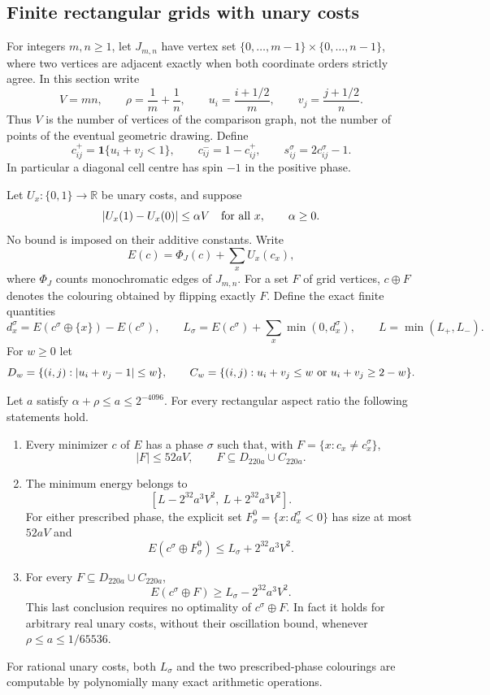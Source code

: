 \subsection{Finite rectangular grids with unary costs}

For integers $m,n\ge1$, let $J_{m,n}$ have vertex set
$\{0,\ldots,m-1\}\times\{0,\ldots,n-1\}$, where two vertices are adjacent
exactly when both coordinate orders strictly agree.  In this section write
\[
 V=mn,\qquad \rho=\frac1m+\frac1n,\qquad
 u_i=\frac{i+1/2}{m},\qquad v_j=\frac{j+1/2}{n}.
\]
Thus $V$ is the number of vertices of the comparison graph, not the
number of points of the eventual geometric drawing.  Define
\[
 c^+_{ij}=\mathbf1\{u_i+v_j<1\},\qquad c^-_{ij}=1-c^+_{ij},
 \qquad s^\sigma_{ij}=2c^\sigma_{ij}-1.
\]
In particular a diagonal cell centre has spin $-1$ in the positive phase.

Let $U_x:\{0,1\}\to\mathbb R$ be unary costs, and suppose
\[
 |U_x(1)-U_x(0)|\le\alpha V\quad\hbox{for all }x,
 \qquad \alpha\ge0.
\]
No bound is imposed on their additive constants.  Write
\[
 E(c)=\Phi_J(c)+\sum_xU_x(c_x),
\]
where $\Phi_J$ counts monochromatic edges of $J_{m,n}$.
For a set $F$ of grid vertices, $c\oplus F$ denotes the colouring obtained
by flipping exactly $F$.  Define the exact finite quantities
\begin{equation}
 d_x^\sigma=E(c^\sigma\oplus\{x\})-E(c^\sigma),\qquad
 L_\sigma=E(c^\sigma)+\sum_x\min(0,d_x^\sigma),\qquad
 L=\min(L_+,L_-).
 \label{eq:finite-linear-floor}
\end{equation}
For $w\ge0$ let
\[
 D_w=\{(i,j):|u_i+v_j-1|\le w\},\qquad
 C_w=\{(i,j):u_i+v_j\le w\ \hbox{or}\ u_i+v_j\ge2-w\}.
\]

\begin{theorem}
\label{thm:grid}
Let $a$ satisfy $\alpha+\rho\le a\le2^{-4096}$.
For every rectangular aspect ratio the following statements hold.
\begin{enumerate}
 \item Every minimizer $c$ of $E$ has a phase $\sigma$ such that, with
 $F=\{x:c_x\ne c_x^\sigma\}$,
 \[
 |F|\le52aV,\qquad F\subseteq D_{220a}\cup C_{220a}.
 \]
 \item The minimum energy belongs to
 \[
 [L-2^{32}a^3V^2,\ L+2^{32}a^3V^2].
 \]
 For either prescribed phase, the explicit set
 $F_\sigma^0=\{x:d_x^\sigma<0\}$ has size at most $52aV$ and
 \[
 E(c^\sigma\oplus F_\sigma^0)\le L_\sigma+2^{32}a^3V^2.
 \]
 \item For every $F\subseteq D_{220a}\cup C_{220a}$,
 \[
 E(c^\sigma\oplus F)\ge L_\sigma-2^{32}a^3V^2.
 \]
 This last conclusion requires no optimality of $c^\sigma\oplus F$.
 In fact it holds for arbitrary real unary costs, without their oscillation
 bound, whenever $\rho\le a\le1/65536$.
\end{enumerate}
For rational unary costs, both $L_\sigma$ and the two prescribed-phase
colourings are computable by polynomially many exact arithmetic operations.
\end{theorem}

